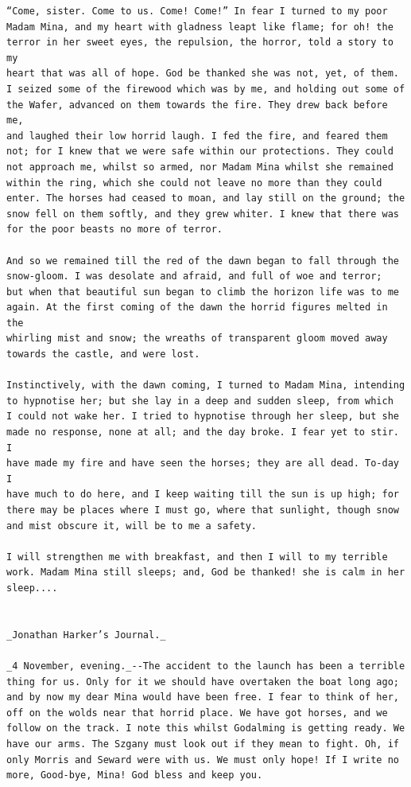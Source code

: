 \documentclass{article}
\begin{document}
\begin{verbatim}
“Come, sister. Come to us. Come! Come!” In fear I turned to my poor
Madam Mina, and my heart with gladness leapt like flame; for oh! the
terror in her sweet eyes, the repulsion, the horror, told a story to my
heart that was all of hope. God be thanked she was not, yet, of them.
I seized some of the firewood which was by me, and holding out some of
the Wafer, advanced on them towards the fire. They drew back before me,
and laughed their low horrid laugh. I fed the fire, and feared them
not; for I knew that we were safe within our protections. They could
not approach me, whilst so armed, nor Madam Mina whilst she remained
within the ring, which she could not leave no more than they could
enter. The horses had ceased to moan, and lay still on the ground; the
snow fell on them softly, and they grew whiter. I knew that there was
for the poor beasts no more of terror.

And so we remained till the red of the dawn began to fall through the
snow-gloom. I was desolate and afraid, and full of woe and terror;
but when that beautiful sun began to climb the horizon life was to me
again. At the first coming of the dawn the horrid figures melted in the
whirling mist and snow; the wreaths of transparent gloom moved away
towards the castle, and were lost.

Instinctively, with the dawn coming, I turned to Madam Mina, intending
to hypnotise her; but she lay in a deep and sudden sleep, from which
I could not wake her. I tried to hypnotise through her sleep, but she
made no response, none at all; and the day broke. I fear yet to stir. I
have made my fire and have seen the horses; they are all dead. To-day I
have much to do here, and I keep waiting till the sun is up high; for
there may be places where I must go, where that sunlight, though snow
and mist obscure it, will be to me a safety.

I will strengthen me with breakfast, and then I will to my terrible
work. Madam Mina still sleeps; and, God be thanked! she is calm in her
sleep....


_Jonathan Harker’s Journal._

_4 November, evening._--The accident to the launch has been a terrible
thing for us. Only for it we should have overtaken the boat long ago;
and by now my dear Mina would have been free. I fear to think of her,
off on the wolds near that horrid place. We have got horses, and we
follow on the track. I note this whilst Godalming is getting ready. We
have our arms. The Szgany must look out if they mean to fight. Oh, if
only Morris and Seward were with us. We must only hope! If I write no
more, Good-bye, Mina! God bless and keep you.



\end{verbatim}
\end{document}
